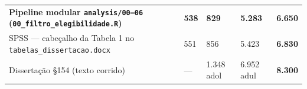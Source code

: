 \documentclass[
]{article}
\begin{document}
\begin{longtable}[]{@{}lllll@{}}
\begin{minipage}[t]{0.17\columnwidth}\raggedright
\textbf{Pipeline modular \texttt{analysis/00–06}
(\texttt{00\_filtro\_elegibilidade.R})}\strut
\end{minipage} & \begin{minipage}[t]{0.17\columnwidth}\raggedright
\textbf{538}\strut
\end{minipage} & \begin{minipage}[t]{0.17\columnwidth}\raggedright
\textbf{829}\strut
\end{minipage} & \begin{minipage}[t]{0.17\columnwidth}\raggedright
\textbf{5.283}\strut
\end{minipage} & \begin{minipage}[t]{0.17\columnwidth}\raggedright
\textbf{6.650}\strut
\end{minipage}\tabularnewline
\begin{minipage}[t]{0.17\columnwidth}\raggedright
SPSS --- cabeçalho da Tabela 1 no
\texttt{tabelas\_dissertacao.docx}\strut
\end{minipage} & \begin{minipage}[t]{0.17\columnwidth}\raggedright
551\strut
\end{minipage} & \begin{minipage}[t]{0.17\columnwidth}\raggedright
856\strut
\end{minipage} & \begin{minipage}[t]{0.17\columnwidth}\raggedright
5.423\strut
\end{minipage} & \begin{minipage}[t]{0.17\columnwidth}\raggedright
\textbf{6.830}\strut
\end{minipage}\tabularnewline
\begin{minipage}[t]{0.17\columnwidth}\raggedright
Dissertação §154 (texto corrido)\strut
\end{minipage} & \begin{minipage}[t]{0.17\columnwidth}\raggedright
---\strut
\end{minipage} & \begin{minipage}[t]{0.17\columnwidth}\raggedright
1.348 adol\strut
\end{minipage} & \begin{minipage}[t]{0.17\columnwidth}\raggedright
6.952 adul\strut
\end{minipage} & \begin{minipage}[t]{0.17\columnwidth}\raggedright
\textbf{8.300}\strut
\end{minipage}\tabularnewline

\end{longtable}
\end{document}
